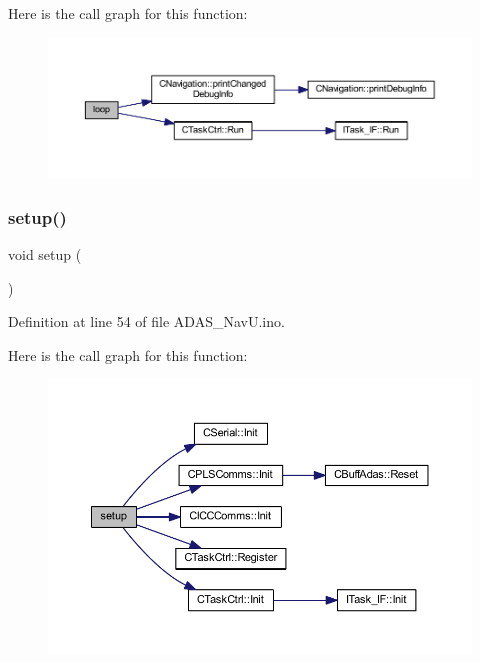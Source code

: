 Here is the call graph for this function\+:\nopagebreak
\begin{figure}[H]
\begin{center}
\leavevmode
\includegraphics[width=350pt]{_a_d_a_s___nav_u_8ino_afe461d27b9c48d5921c00d521181f12f_cgraph}
\end{center}
\end{figure}
\mbox{\label{_a_d_a_s___nav_u_8ino_a4fc01d736fe50cf5b977f755b675f11d}} 
\subsubsection{\texorpdfstring{setup()}{setup()}}
{\footnotesize\ttfamily void setup (\begin{DoxyParamCaption}{ }\end{DoxyParamCaption})}



Definition at line 54 of file A\+D\+A\+S\+\_\+\+Nav\+U.\+ino.

Here is the call graph for this function\+:\nopagebreak
\begin{figure}[H]
\begin{center}
\leavevmode
\includegraphics[width=350pt]{_a_d_a_s___nav_u_8ino_a4fc01d736fe50cf5b977f755b675f11d_cgraph}
\end{center}
\end{figure}


